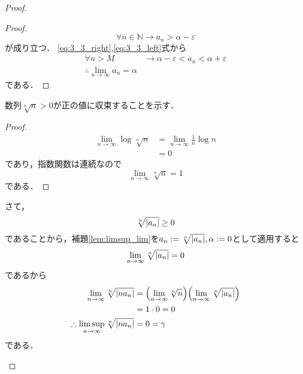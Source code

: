 \begin{enumerate}[(1)]
\begin{enumerate}[(i)]
\begin{proof}
\begin{itemize}
\begin{proof}
                    \begin{equation}
                        \forall n\in\mathbb{N}\to a_n > \alpha- \varepsilon\label{eq:3_3_left}
                    \end{equation}
                    が成り立つ．
                    \eqref{eq:3_3_right},\eqref{eq:3_3_left}式から
                    \begin{align}
                        \forall n>M &\to \alpha- \varepsilon<a_n<\alpha+\varepsilon\\
                        \therefore
                        \lim_{n\to\infty}a_n=\alpha
                    \end{align}
                    である．
                \end{proof}
                
                
                
                数列$\sqrt[n]{n}>0$が正の値に収束することを示す．
                \begin{proof}
                    \begin{align}
                        \lim_{n\to\infty}\log{\sqrt[n]{n}}
                        &=\lim_{n\to\infty}\frac{1}{n}\log n\\
                        &= 0
                    \end{align}
                    であり，指数関数は連続なので
                    \begin{equation}
                        \lim_{n\to\infty}\sqrt[n]{n}=1
                    \end{equation}
                    である．
                \end{proof}
                さて，
                \begin{equation}
                    \sqrt[n]{\abs{a_n}}\ge 0
                \end{equation}
                であることから，補題\ref{lem:limsup_lim}を$a_n:=\sqrt[n]{\abs{a_n}},\alpha:=0$として適用すると
                \begin{equation}
                    \lim_{n\to\infty}\sqrt[n]{\abs{a_n}} = 0
                \end{equation}
                であるから
                \begin{align}
                    \lim_{n\to\infty}\sqrt[n]{\abs{na_n}}
                    &=
                    \qty(\lim_{n\to\infty}\sqrt[n]{n})
                    \qty(\lim_{n\to\infty}\sqrt[n]{\abs{a_n}})\\
                    &=1\cdot 0 = 0\\
                    \therefore
                    \limsup_{n\to\infty}\sqrt[n]{\abs{na_n}}
                    &=0=\gamma
                \end{align}
                である．
                

\end{itemize}
\end{proof}
\end{enumerate}
\end{enumerate}
